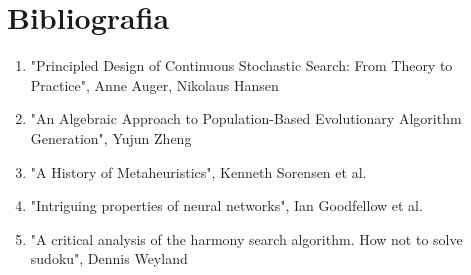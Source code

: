 \documentclass[slidescentered]{beamer}
\begin{document}
\section{Bibliografia}
	\begin{enumerate}
		\item "Principled Design of Continuous Stochastic Search: From Theory to Practice", Anne Auger, Nikolaus Hansen 
		\item "An Algebraic Approach to Population-Based Evolutionary Algorithm Generation", Yujun Zheng
		\item "A History of Metaheuristics", Kenneth Sorensen et al.\label{hist}
		\item "Intriguing properties of neural networks", Ian Goodfellow et al. \label{cnn}
		\item "A critical analysis of the harmony search algorithm. How not to solve sudoku", Dennis Weyland \label{harmony}
	\end{enumerate}
\end{document}
